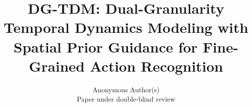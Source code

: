 \documentclass{article}
\title{DG-TDM: Dual-Granularity Temporal Dynamics Modeling with Spatial Prior Guidance for Fine-Grained Action Recognition}
\author{Anonymous Author(s) \\
  Paper under double-blind review}
\begin{document}
\maketitle













{
\small


}
\end{document}
